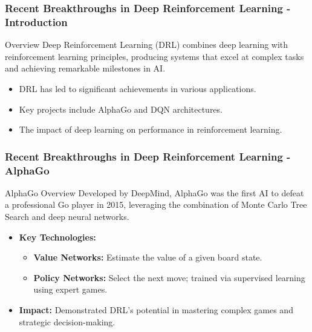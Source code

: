 \documentclass[aspectratio=169]{beamer}
\begin{document}
\begin{frame}[fragile]
    \frametitle{Recent Breakthroughs in Deep Reinforcement Learning - Introduction}
    \begin{block}{Overview}
        Deep Reinforcement Learning (DRL) combines deep learning with reinforcement learning principles, producing systems that excel at complex tasks and achieving remarkable milestones in AI.
    \end{block}
    
    \begin{itemize}
        \item DRL has led to significant achievements in various applications.
        \item Key projects include AlphaGo and DQN architectures.
        \item The impact of deep learning on performance in reinforcement learning.
    \end{itemize}
\end{frame}

\begin{frame}[fragile]
    \frametitle{Recent Breakthroughs in Deep Reinforcement Learning - AlphaGo}
    \begin{block}{AlphaGo Overview}
        Developed by DeepMind, AlphaGo was the first AI to defeat a professional Go player in 2015, leveraging
        the combination of Monte Carlo Tree Search and deep neural networks.
    \end{block}
    
    \begin{itemize}
        \item \textbf{Key Technologies:}
            \begin{itemize}
                \item \textbf{Value Networks:} Estimate the value of a given board state.
                \item \textbf{Policy Networks:} Select the next move; trained via supervised learning using expert games.
            \end{itemize}
        \item \textbf{Impact:} Demonstrated DRL's potential in mastering complex games and strategic decision-making.
    \end{itemize}
\end{frame}
\end{document}
